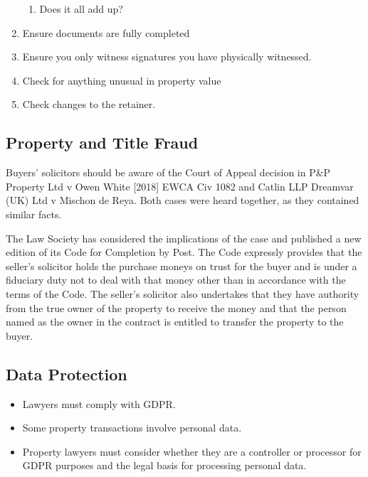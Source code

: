 \documentclass[
]{article}
\providecommand{\tightlist}{%
  \setlength{\itemsep}{0pt}\setlength{\parskip}{0pt}}
\begin{document}
\begin{enumerate}
  \begin{enumerate}
  \tightlist
  \item
    Does it all add up?
  \end{enumerate}
\item
  Ensure documents are fully completed
\item
  Ensure you only witness signatures you have physically witnessed.
\item
  Check for anything unusual in property value
\item
  Check changes to the retainer.
\end{enumerate}

\hypertarget{property-and-title-fraud}{%
\subsection{Property and Title Fraud}\label{property-and-title-fraud}}

Buyers' solicitors should be aware of the Court of Appeal decision in
P\&P Property Ltd v Owen White {[}2018{]} EWCA Civ 1082 and Catlin LLP
Dreamvar (UK) Ltd v Mischon de Reya. Both cases were heard together, as
they contained similar facts.

The Law Society has considered the implications of the case and
published a new edition of its Code for Completion by Post. The Code
expressly provides that the seller's solicitor holds the purchase moneys
on trust for the buyer and is under a fiduciary duty not to deal with
that money other than in accordance with the terms of the Code. The
seller's solicitor also undertakes that they have authority from the
true owner of the property to receive the money and that the person
named as the owner in the contract is entitled to transfer the property
to the buyer.

\hypertarget{data-protection}{%
\subsection{Data Protection}\label{data-protection}}

\begin{itemize}
\tightlist
\item
  Lawyers must comply with GDPR.
\item
  Some property transactions involve personal data.
\item
  Property lawyers must consider whether they are a controller or
  processor for GDPR purposes and the legal basis for processing
  personal data.
\end{itemize}
\end{document}
